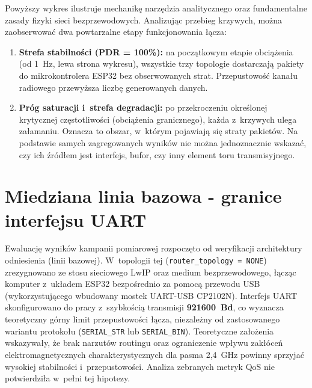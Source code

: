 Powyższy wykres ilustruje mechanikę narzędzia analitycznego oraz fundamentalne zasady fizyki sieci bezprzewodowych.
Analizując przebieg krzywych, można zaobserwować dwa powtarzalne etapy funkcjonowania łącza:
\begin{enumerate}
      \item \textbf{Strefa stabilności (PDR = 100\%):}
            na początkowym etapie obciążenia (od 1~Hz, lewa strona wykresu), wszystkie trzy topologie dostarczają pakiety do mikrokontrolera ESP32 bez obserwowanych strat.
            Przepustowość kanału radiowego przewyższa liczbę generowanych danych.
      \item \textbf{Próg saturacji i~strefa degradacji:}
            po przekroczeniu określonej krytycznej częstotliwości (obciążenia granicznego), każda z~krzywych ulega załamaniu.
            Oznacza to obszar, w~którym pojawiają się straty pakietów.
            Na podstawie samych zagregowanych wyników nie można jednoznacznie wskazać, czy ich źródłem jest interfejs, bufor, czy inny element toru transmisyjnego.
\end{enumerate}

\section{Miedziana linia bazowa - granice interfejsu UART}
\label{sec:analiza_uart}

Ewaluację wyników kampanii pomiarowej rozpoczęto od weryfikacji architektury odniesienia (linii bazowej).
W~topologii tej (\texttt{router\_topology = NONE}) zrezygnowano ze stosu sieciowego LwIP oraz medium bezprzewodowego, łącząc komputer z~układem ESP32 bezpośrednio za pomocą przewodu USB (wykorzystującego wbudowany mostek UART-USB CP2102N).
Interfejs UART skonfigurowano do pracy z~szybkością transmisji \textbf{921600~Bd}, co wyznacza teoretyczny górny limit przepustowości łącza, niezależny od zastosowanego wariantu protokołu (\texttt{SERIAL\_STR} lub \texttt{SERIAL\_BIN}).
Teoretyczne założenia wskazywały, że brak narzutów routingu oraz ograniczenie wpływu zakłóceń elektromagnetycznych charakterystycznych dla pasma 2,4~GHz powinny sprzyjać wysokiej stabilności i~przepustowości.
Analiza zebranych metryk QoS nie potwierdziła w~pełni tej hipotezy.

